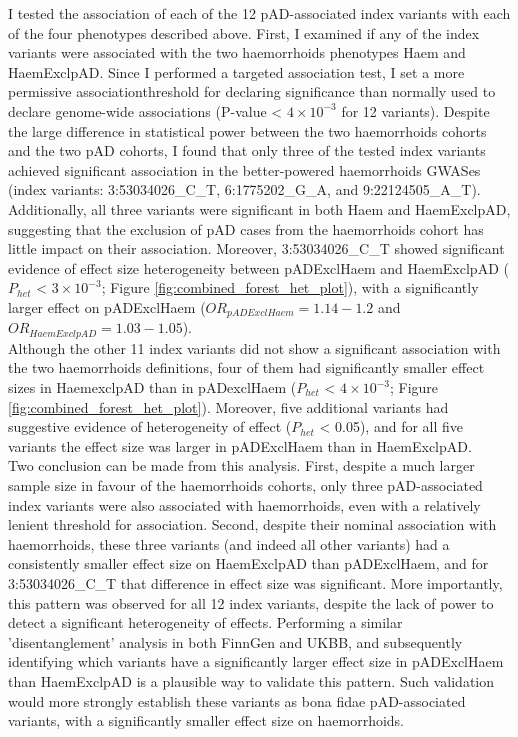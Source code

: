 I tested the association of each of the 12 pAD-associated index variants with each of the four phenotypes described above. First, I examined if any of the index variants were associated with the two haemorrhoids phenotypes Haem and HaemExclpAD. Since I performed a targeted association test, I set a more permissive associationthreshold for declaring significance than normally used to declare genome-wide associations (P-value < $4\times10^{-3}$ for 12 variants). Despite the large difference in statistical power between the two haemorrhoids cohorts and the two pAD cohorts, I found that only three of the tested index variants achieved significant association in the better-powered haemorrhoids GWASes (index variants: 3:53034026\_C\_T, 6:1775202\_G\_A, and 9:22124505\_A\_T). Additionally, all three variants were significant in both Haem and HaemExclpAD, suggesting that the exclusion of pAD cases from the haemorrhoids cohort has little impact on their association. Moreover, 3:53034026\_C\_T showed significant evidence of effect size heterogeneity between pADExclHaem and HaemExclpAD ($P_{het}$ < $3\times10^{-3}$; Figure \ref{fig:combined_forest_het_plot}), with a significantly larger effect on pADExclHaem ($OR_{pADExclHaem}=1.14-1.2$ and $OR_{HaemExclpAD}=1.03-1.05$).\\

Although the other 11 index variants did not show a significant association with the two haemorrhoids definitions, four of them had significantly smaller effect sizes in HaemexclpAD than in pADexclHaem ($P_{het}$ < $4\times10^{-3}$; Figure \ref{fig:combined_forest_het_plot}). Moreover, five additional variants had suggestive evidence of heterogeneity of effect ($P_{het}$ < 0.05), and for all five variants the effect size was larger in pADExclHaem than in HaemExclpAD. \\

Two conclusion can be made from this analysis. First, despite a much larger sample size in favour of the haemorrhoids cohorts, only three pAD-associated index variants were also associated with haemorrhoids, even with a relatively lenient threshold for association. Second, despite their nominal association with haemorrhoids, these three variants (and indeed all other variants) had a consistently smaller effect size on HaemExclpAD than pADExclHaem, and for 3:53034026\_C\_T that difference in effect size was significant. More importantly, this pattern was observed for all 12 index variants, despite the lack of power to detect a significant heterogeneity of effects. Performing a similar 'disentanglement' analysis in both FinnGen and UKBB, and subsequently identifying which variants have a significantly larger effect size in pADExclHaem than HaemExclpAD is a plausible way to validate this pattern. Such validation would more strongly establish these variants as bona fidae pAD-associated variants, with a significantly smaller effect size on haemorrhoids.\\

